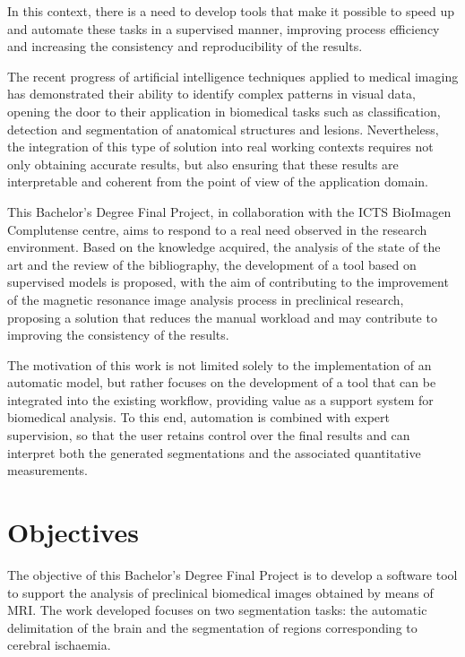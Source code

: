In this context, there is a need to develop tools that make it possible to speed up and automate these tasks in a supervised manner, improving process efficiency and increasing the consistency and reproducibility of the results.

The recent progress of artificial intelligence techniques applied to medical imaging has demonstrated their ability to identify complex patterns in visual data, opening the door to their application in biomedical tasks such as classification, detection and segmentation of anatomical structures and lesions. Nevertheless, the integration of this type of solution into real working contexts requires not only obtaining accurate results, but also ensuring that these results are interpretable and coherent from the point of view of the application domain. \citep{Akkus2017,litjens2017survey}

This Bachelor's Degree Final Project, in collaboration with the ICTS BioImagen Complutense centre, aims to respond to a real need observed in the research environment. Based on the knowledge acquired, the analysis of the state of the art and the review of the bibliography, the development of a tool based on supervised models is proposed, with the aim of contributing to the improvement of the magnetic resonance image analysis process in preclinical research, proposing a solution that reduces the manual workload and may contribute to improving the consistency of the results.

The motivation of this work is not limited solely to the implementation of an automatic model, but rather focuses on the development of a tool that can be integrated into the existing workflow, providing value as a support system for biomedical analysis. To this end, automation is combined with expert supervision, so that the user retains control over the final results and can interpret both the generated segmentations and the associated quantitative measurements.

\section*{Objectives}

The objective of this Bachelor's Degree Final Project is to develop a software tool to support the analysis of preclinical biomedical images obtained by means of MRI. The work developed focuses on two segmentation tasks: the automatic delimitation of the brain and the segmentation of regions corresponding to cerebral ischaemia.

